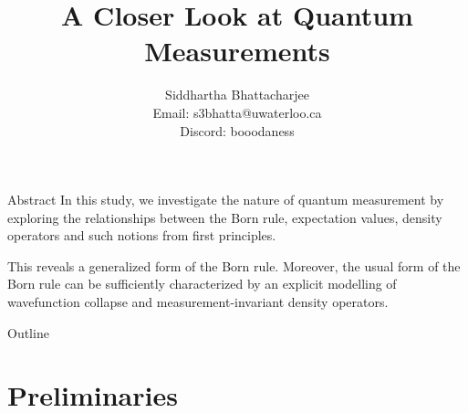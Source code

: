\documentclass[9pt,handout]{beamer}
\title[\textbf{A Closer Look at Quantum Measurements}]{A Closer Look at Quantum Measurements} %
\author[\textbf{Sid (s3bhatta@uwaterloo.ca)}]
{Siddhartha Bhattacharjee \\
Email: s3bhatta@uwaterloo.ca \\
Discord: booodaness} %
\institute[\textbf{University of Waterloo, Faculty of Science}] %
{Mathematical Physics (1C)\\
University of Waterloo %
}
\begin{document}
{
\beamertemplatenavigationsymbolsempty
\begin{frame}[plain]
\titlepage
\end{frame}
}

\begin{frame}{Abstract}
In this study, we investigate the nature of quantum measurement by exploring the relationships between the Born rule, expectation values, density operators and such notions from first principles. 
  
This reveals a generalized form of the Born rule. Moreover, the usual form of the Born rule can be sufficiently characterized by an explicit modelling of wavefunction collapse and measurement-invariant density operators.
\end{frame}

{
\beamertemplatenavigationsymbolsempty
{}
{ }
\begin{frame}{Outline} 
\tableofcontents 
\end{frame} 
}
\addtocounter{framenumber}{-2}

\section{Preliminaries}
\end{document}
